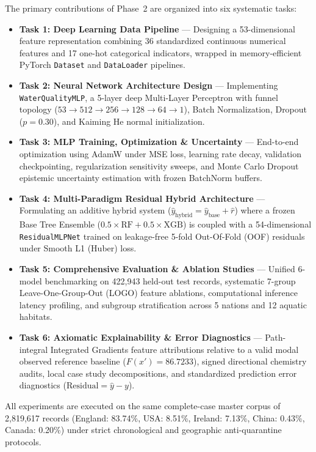 \documentclass[conference]{IEEEtran}
\begin{document}
The primary contributions of Phase~2 are organized into six systematic tasks:
\begin{itemize}
  \item \textbf{Task 1: Deep Learning Data Pipeline} --- Designing a 53-dimensional
        feature representation combining 36 standardized continuous numerical features
        and 17 one-hot categorical indicators, wrapped in memory-efficient PyTorch
        \texttt{Dataset} and \texttt{DataLoader} pipelines.
  \item \textbf{Task 2: Neural Network Architecture Design} --- Implementing
        \texttt{WaterQualityMLP}, a 5-layer deep Multi-Layer Perceptron with funnel
        topology ($53 \to 512 \to 256 \to 128 \to 64 \to 1$), Batch Normalization,
        Dropout ($p=0.30$), and Kaiming He normal initialization.
  \item \textbf{Task 3: MLP Training, Optimization \& Uncertainty} --- End-to-end
        optimization using AdamW under MSE loss, learning rate decay, validation
        checkpointing, regularization sensitivity sweeps, and Monte Carlo Dropout
        epistemic uncertainty estimation with frozen BatchNorm buffers.
  \item \textbf{Task 4: Multi-Paradigm Residual Hybrid Architecture} ---
        Formulating an additive hybrid system ($\hat{y}_{\text{hybrid}} = \hat{y}_{\text{base}} + \hat{r}$)
        where a frozen Base Tree Ensemble ($0.5\times\text{RF} + 0.5\times\text{XGB}$)
        is coupled with a 54-dimensional \texttt{ResidualMLPNet} trained on leakage-free
        5-fold Out-Of-Fold (OOF) residuals under Smooth L1 (Huber) loss.
  \item \textbf{Task 5: Comprehensive Evaluation \& Ablation Studies} ---
        Unified 6-model benchmarking on 422,943 held-out test records, systematic
        7-group Leave-One-Group-Out (LOGO) feature ablations, computational inference
        latency profiling, and subgroup stratification across 5 nations and 12 aquatic habitats.
  \item \textbf{Task 6: Axiomatic Explainability \& Error Diagnostics} ---
        Path-integral Integrated Gradients feature attributions relative to a valid modal
        observed reference baseline ($F(x') = 86.7233$), signed directional chemistry
        audits, local case study decompositions, and standardized prediction error
        diagnostics ($\text{Residual} = \hat{y} - y$).
\end{itemize}

All experiments are executed on the same complete-case master corpus of 2,819,617 records
(England: 83.74\%, USA: 8.51\%, Ireland: 7.13\%, China: 0.43\%, Canada: 0.20\%) under
strict chronological and geographic anti-quarantine protocols.
\end{document}
